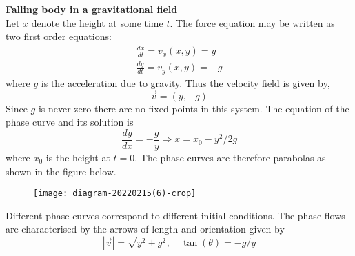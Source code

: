\begin{example}\textbf{Falling body in a gravitational field}\\
Let $x$ denote the height at some time $t$. The force equation may be written as two first order equations:
$$
\begin{gathered}
\frac{d x}{d t}=v_{x}(x, y)=y \\
\frac{d y}{d t}=v_{y}(x, y)=-g
\end{gathered}
$$
where $g$ is the acceleration due to gravity. Thus the velocity field is given by,
$$
\vec{v}=(y,-g)
$$
Since $g$ is never zero there are no fixed points in this system. The equation of the phase curve and its solution is	\\
$$
\frac{d y}{d x}=-\frac{g}{y} \Rightarrow x=x_{0}-y^{2} / 2 g
$$
where $x_{0}$ is the height at $t=0$. The phase curves are therefore parabolas as shown in the figure below.\\
\begin{figure}[H]
	\centering
	\texttt{[image: diagram-20220215(6)-crop]}
	\caption{}
	\label{}
\end{figure}
Different phase curves correspond to different initial conditions. The phase flows are characterised by the arrows of length and orientation given by
$$
|\vec{v}|=\sqrt{y^{2}+g^{2}}, \quad \tan (\theta)=-g / y
$$
\end{example}


